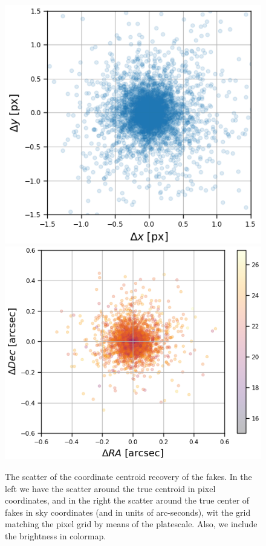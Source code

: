 \begin{figure}
    \centering
    \includegraphics[height=0.3\textheight]{dia/figures/scatter_xy_diaSrcs_match_px.png}
    \hfil
    \includegraphics[height=0.3\textheight]{dia/figures/scatter_radec_diaSrcs_match_arsec_mag.png}
    \caption{The scatter of the coordinate centroid recovery of the fakes. In the left we have the scatter around the true centroid in pixel coordinates, and in the right the scatter around the true center of fakes in sky coordinates (and in units of arc-seconds), wit the grid matching the pixel grid by means of the platescale. Also, we include the brightness in colormap.}
    \label{fig:scatter_radec_diaSrcs_match_arsec_mag}
\end{figure}

